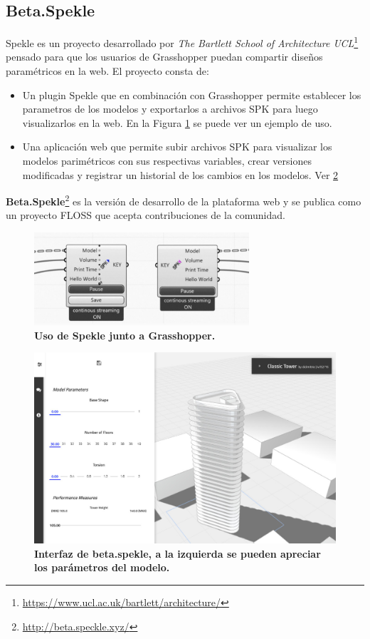 \subsection{Beta.Spekle}

Spekle\citep{UCL2018} es un proyecto desarrollado por \textit{The Bartlett School of Architecture UCL}\footnote{\url{https://www.ucl.ac.uk/bartlett/architecture/}} pensado para que los usuarios de Grasshopper puedan compartir diseños paramétricos en la web. 
El proyecto consta de:
\begin{itemize}
    \item Un plugin Spekle que en combinación con Grasshopper permite establecer los parametros de los modelos y exportarlos a archivos SPK para luego visualizarlos en la web. En la Figura \ref{fig:plugin} se puede ver un ejemplo de uso.
    \item Una aplicación web que permite subir archivos SPK para visualizar los modelos parimétricos con sus respectivas variables, crear versiones modificadas y registrar un historial de los cambios en los modelos. Ver \ref{fig:spekle}
\end{itemize}

\textbf{Beta.Spekle}\footnote{\url{http://beta.speckle.xyz/}} es la versión de desarrollo de la plataforma web y se publica como un proyecto FLOSS que acepta contribuciones de la comunidad.

\begin{figure}[h]
\includegraphics[width=8cm]{Img/WEB/web-plugin.jpg}
\centering
\caption{\textbf{ \footnotesize{Uso de Spekle junto a Grasshopper.}}}
\label{fig:plugin}
\end{figure}

\begin{figure}[h]
\includegraphics[width=14cm]{Img/WEB/web-spekle.jpg}
\centering
\caption{\textbf{ \footnotesize{Interfaz de beta.spekle, a la izquierda se pueden apreciar los parámetros del modelo.}}}
\label{fig:spekle}
\end{figure}


